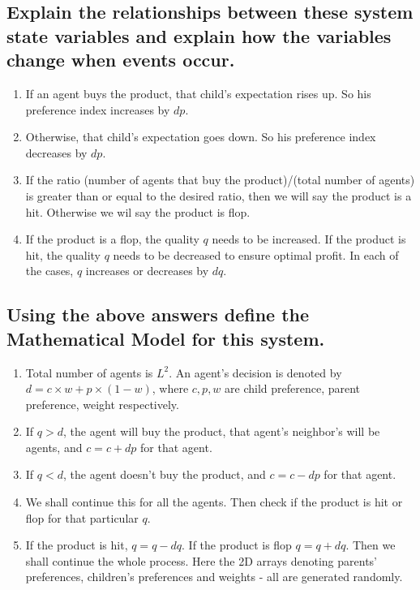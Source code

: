 \documentclass[article, 11pt, a4paper, onesize]{memoir}
\begin{document}
\subsection{Explain the relationships between these system state variables and explain how
the variables change when events occur.}

\begin{enumerate}
    \item If an agent buys the product, that child's expectation rises up. So his
        preference index increases by \(dp\).
    \item Otherwise, that child's expectation goes down. So his preference index decreases
        by \(dp\).
    \item If the ratio (number of agents that buy the product)/(total number of agents) is
        greater than or equal to the desired ratio, then we will say the product is a hit.
        Otherwise we wil say the product is flop.
    \item If the product is a flop, the quality \(q\) needs to be increased. If the
        product is hit, the quality \(q\) needs to be decreased to ensure optimal profit.
        In each of the cases, \(q\) increases or decreases by \(dq\).
\end{enumerate}


\subsection{Using the above answers define the Mathematical Model for this system.}

\begin{enumerate}
    \item Total number of agents is \(L^2\). An agent's decision is denoted by \(d=c\times
        w+p\times(1-w)\), where \(c,p,w\) are child preference, parent preference, weight
        respectively. 
    \item If \(q>d\), the agent will buy the product, that agent's neighbor's will be
        agents, and \(c=c+dp\) for that agent.
    \item If \(q<d\), the agent doesn't buy the product, and \(c=c-dp\) for that agent. 
    \item We shall continue this for all the agents. Then check if the product is hit or
        flop for that particular \(q\). 
    \item If the product is hit, \(q=q-dq\). If the product is flop \(q=q+dq\). Then we
        shall continue the whole process. Here the 2D arrays denoting parents'
        preferences, children's preferences and weights - all are generated randomly.
\end{enumerate}
\end{document}
